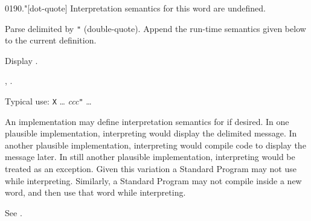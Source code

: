 \begin{worddef}[.q]{0190}{."}[dot-quote]
\interpret
	Interpretation semantics for this word are undefined.

\compile

	Parse  delimited by \texttt{"} (double-quote).
	Append the run-time semantics given below to the current
	definition.

\runtime
	\stack{}{}

	Display .

\see {},
	.

	\begin{defer}
	\rationale %
		Typical use:
			\word{:} \texttt{X} {\ldots}
				 \emph{ccc}\texttt{"} {\ldots}
			\word{;}

		An implementation may define interpretation semantics for
		 if desired. In one plausible implementation,
		interpreting  would display the delimited message.
		In another plausible implementation, interpreting 
		would compile code to display the message later. In still
		another plausible implementation, interpreting  would
		be treated as an exception. Given this variation a Standard
		Program may not use  while interpreting. Similarly,
		a Standard Program may not compile  
		inside a new word, and then use that word while interpreting.

	\testing*
		See .
	\end{defer}
\end{worddef}


